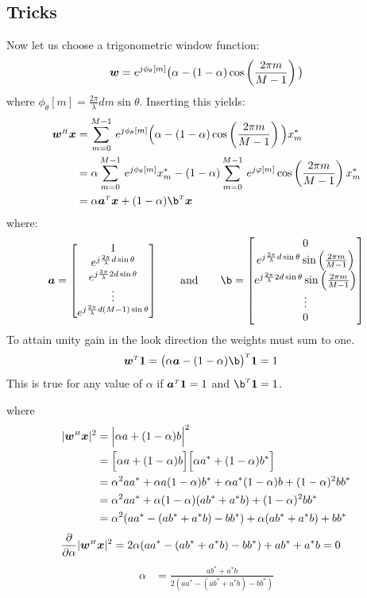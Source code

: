 \subsection{Tricks}

Now let us choose a trigonometric window function:
%
\begin{align}
\boldsymbol{w} = e^{j\phi_\theta[m]}\big(\alpha - (1-\alpha)\cos\left(\frac{2\pi m}{M-1}\right)\big)
\end{align}
%
where $\phi_\theta[m] = \frac{2\pi}{\lambda}dm\sin\theta$. Inserting this yields:
%
\begin{align}
\w\H\x &= \sumb{m=0}{M-1} e^{j\phi_\theta[m]}\Big(\alpha - (1-\alpha)\cos\left(\frac{2\pi m}{M-1}\right)\Big) x_m^* \nn
&= \alpha\sumb{m=0}{M-1} e^{j\phi_\theta[m]} x_m^* - (1-\alpha)\sumb{m=0}{M-1} e^{j\varphi[m]}\cos\left(\frac{2\pi m}{M-1}\right) x_m^* \\
&= \alpha \a\T\x + (1-\alpha)\b\T\x
\end{align}
%
where:
%
\begin{align}
\a = \begin{bmatrix}
     1 \\
     e^{j\frac{2\pi}{\lambda}d\sin\theta} \\
     e^{j\frac{2\pi}{\lambda}2d\sin\theta} \\
     \vdots \\
     e^{j\frac{2\pi}{\lambda}d(M-1)\sin\theta}
     \end{bmatrix} \qquad \text{and} \qquad
\b = \begin{bmatrix}
     0 \\
     e^{j\frac{2\pi}{\lambda}d\sin\theta}\sin\left(\frac{2\pi m}{M-1}\right) \\
     e^{j\frac{2\pi}{\lambda}2d\sin\theta}\sin\left(\frac{2\pi m}{M-1}\right) \\
     \vdots \\
     0
     \end{bmatrix}
\end{align}
%
To attain unity gain in the look direction the weights must sum to one. 
%
\begin{align}
\w\T\1 &= \big(\alpha\a - (1-\alpha)\b\big)\T\1 = 1
\end{align}
%
This is true for any value of $\alpha$ if $\boldsymbol{a}^{\scriptscriptstyle T}\boldsymbol{1} = 1$ and $\b\T\1 = 1$. 

where
%
\begin{align}
|\boldsymbol{w}^{\scriptscriptstyle H}\boldsymbol{x}|^2 &= \Big| \alpha a + (1-\alpha)b \Big|^2 \nonumber\\
&= \Big[\alpha a + (1-\alpha)b\Big] \Big[\alpha a^* + (1-\alpha)b^*\Big] \nonumber\\
&= \alpha^2 aa^* + \alpha a(1-\alpha)b^* + \alpha a^*(1-\alpha)b + (1-\alpha)^2bb^* \nonumber\\
&= \alpha^2 aa^* + \alpha(1-\alpha)(ab^* + a^*b) + (1-\alpha)^2bb^* \nonumber\\
&= \alpha^2 (aa^* - (ab^* + a^*b) - bb^*) + \alpha(ab^* + a^*b) + bb^* \nonumber\\
\end{align}
%
\begin{align}
\frac{\partial}{\partial\alpha} |\boldsymbol{w}^{\scriptscriptstyle H}\boldsymbol{x}|^2 
&= 2\alpha (aa^* - (ab^* + a^*b) - bb^*) + ab^* + a^*b = 0
\end{align}
%
\begin{align}
\alpha &= \frac{ab^* + a^*b}{2(aa^* - (ab^* + a^*b) - bb^*)}
\end{align}

